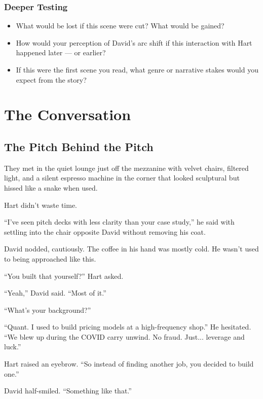 \subsubsection{Deeper Testing}

\begin{itemize}
  \item What would be lost if this scene were cut? What would be gained?
  \item How would your perception of David’s arc shift if this interaction with Hart happened later — or earlier?
  \item If this were the first scene you read, what genre or narrative stakes would you expect from the story?
\end{itemize}



\section{The Conversation}

\subsection{The Pitch Behind the Pitch}

They met in the quiet lounge just off the mezzanine with
velvet chairs, filtered light, and a silent espresso machine in the corner that looked sculptural but hissed like a 
snake when used. 

Hart didn’t waste time.

``I’ve seen pitch decks with less clarity than your case study,'' he said with settling into the chair opposite David 
without removing his coat.

David nodded, cautiously. The coffee in his hand was mostly cold. He wasn’t used to being approached like this.

``You built that yourself?'' Hart asked.

``Yeah,'' David said. ``Most of it.''

``What’s your background?''

``Quant. I used to build pricing models at a high-frequency shop.'' 
He hesitated. ``We blew up during the COVID carry unwind. No fraud. Just... leverage and luck.''

Hart raised an eyebrow. ``So instead of finding another job, you decided to build one.''

David half-smiled. ``Something like that.''


